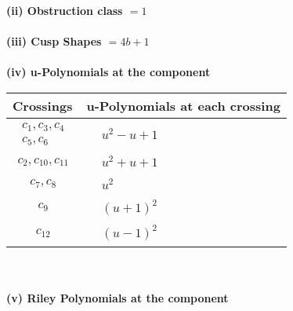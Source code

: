 \documentclass[1p]{elsarticle_modified}
\theoremstyle{definition}
\begin{document}
\flushleft \textbf{(ii) Obstruction class $= 1$}\\~\\
\flushleft \textbf{(iii) Cusp Shapes $= 4 b+1$}\\~\\
\newpage\renewcommand{\arraystretch}{1}
\flushleft \textbf{(iv) u-Polynomials at the component}\newline \\
\begin{tabular}{m{50pt}|m{274pt}}
Crossings & \hspace{64pt}u-Polynomials at each crossing \\
\hline $$\begin{aligned}c_{1},c_{3},c_{4}\\c_{5},c_{6}\end{aligned}$$&$\begin{aligned}
&u^2- u+1
\end{aligned}$\\
\hline $$\begin{aligned}c_{2},c_{10},c_{11}\end{aligned}$$&$\begin{aligned}
&u^2+u+1
\end{aligned}$\\
\hline $$\begin{aligned}c_{7},c_{8}\end{aligned}$$&$\begin{aligned}
&u^2
\end{aligned}$\\
\hline $$\begin{aligned}c_{9}\end{aligned}$$&$\begin{aligned}
&(u+1)^2
\end{aligned}$\\
\hline $$\begin{aligned}c_{12}\end{aligned}$$&$\begin{aligned}
&(u-1)^2
\end{aligned}$\\
\hline
\end{tabular}\\~\\
\newpage\renewcommand{\arraystretch}{1}
\flushleft \textbf{(v) Riley Polynomials at the component}\newline \\
\end{document}
